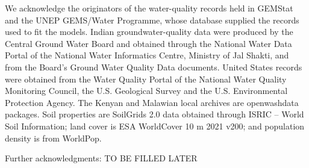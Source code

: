 \documentclass[10pt,letterpaper]{article}
\begin{document}
We acknowledge the originators of the water-quality records held in GEMStat and the UNEP GEMS/Water Programme, whose database supplied the records used to fit the models. Indian groundwater-quality data were produced by the Central Ground Water Board and obtained through the National Water Data Portal of the National Water Informatics Centre, Ministry of Jal Shakti, and from the Board's Ground Water Quality Data documents. United States records were obtained from the Water Quality Portal of the National Water Quality Monitoring Council, the U.S. Geological Survey and the U.S. Environmental Protection Agency. The Kenyan and Malawian local archives are openwashdata packages. Soil properties are SoilGrids 2.0 data obtained through ISRIC -- World Soil Information; land cover is ESA WorldCover 10 m 2021 v200; and population density is from WorldPop.

Further acknowledgments: TO BE FILLED LATER

\nolinenumbers
\end{document}
